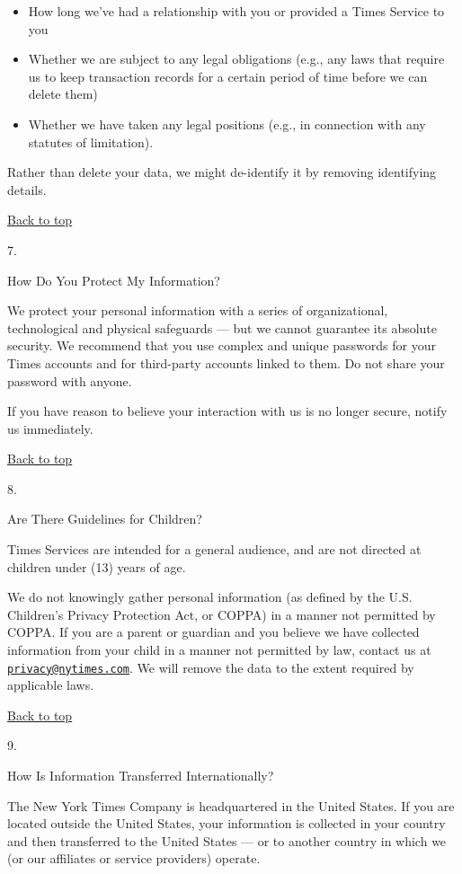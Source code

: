 \begin{itemize}
\tightlist
\item
  How long we've had a relationship with you or provided a Times Service
  to you
\item
  Whether we are subject to any legal obligations (e.g., any laws that
  require us to keep transaction records for a certain period of time
  before we can delete them)
\item
  Whether we have taken any legal positions (e.g., in connection with
  any statutes of limitation).
\end{itemize}

Rather than delete your data, we might de-identify it by removing
identifying details.

\href{app}{Back to top}

7.

How Do You Protect My Information?

We protect your personal information with a series of organizational,
technological and physical safeguards --- but we cannot guarantee its
absolute security. We recommend that you use complex and unique
passwords for your Times accounts and for third-party accounts linked to
them. Do not share your password with anyone.

If you have reason to believe your interaction with us is no longer
secure, notify us immediately.

\href{app}{Back to top}

8.

Are There Guidelines for Children?

Times Services are intended for a general audience, and are not directed
at children under (13) years of age.

We do not knowingly gather personal information (as defined by the U.S.
Children's Privacy Protection Act, or COPPA) in a manner not permitted
by COPPA. If you are a parent or guardian and you believe we have
collected information from your child in a manner not permitted by law,
contact us at
\href{mailto:privacy@nytimes.com}{\nolinkurl{privacy@nytimes.com}}. We
will remove the data to the extent required by applicable laws.

\href{app}{Back to top}

9.

How Is Information Transferred Internationally?

The New York Times Company is headquartered in the United States. If you
are located outside the United States, your information is collected in
your country and then transferred to the United States --- or to another
country in which we (or our affiliates or service providers) operate.

